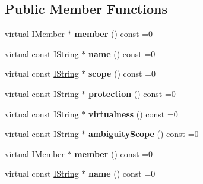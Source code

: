 \subsection*{Public Member Functions}
\begin{DoxyCompactItemize}
\item 
\mbox{\label{class_i_member_reference_ab4661b465ced109b00ef6eb16cc86cae}} 
virtual \mbox{\hyperlink{class_i_member}{I\+Member}} $\ast$ {\bfseries member} () const =0
\item 
\mbox{\label{class_i_member_reference_a9a088e72007a90f84ff891fb75b42264}} 
virtual const \mbox{\hyperlink{class_i_string}{I\+String}} $\ast$ {\bfseries name} () const =0
\item 
\mbox{\label{class_i_member_reference_a03c260b8caefa88f1795a07fe58725d0}} 
virtual const \mbox{\hyperlink{class_i_string}{I\+String}} $\ast$ {\bfseries scope} () const =0
\item 
\mbox{\label{class_i_member_reference_a72be0800929ad0d6203dec8d54c51f46}} 
virtual const \mbox{\hyperlink{class_i_string}{I\+String}} $\ast$ {\bfseries protection} () const =0
\item 
\mbox{\label{class_i_member_reference_aaca18605eb8061bb6aacc2d003508e68}} 
virtual const \mbox{\hyperlink{class_i_string}{I\+String}} $\ast$ {\bfseries virtualness} () const =0
\item 
\mbox{\label{class_i_member_reference_a22d546b2a7ec35b9e162f47b9f09000f}} 
virtual const \mbox{\hyperlink{class_i_string}{I\+String}} $\ast$ {\bfseries ambiguity\+Scope} () const =0
\item 
\mbox{\label{class_i_member_reference_ab4661b465ced109b00ef6eb16cc86cae}} 
virtual \mbox{\hyperlink{class_i_member}{I\+Member}} $\ast$ {\bfseries member} () const =0
\item 
\mbox{\label{class_i_member_reference_a9a088e72007a90f84ff891fb75b42264}} 
virtual const \mbox{\hyperlink{class_i_string}{I\+String}} $\ast$ {\bfseries name} () const =0
\item 

\end{DoxyCompactItemize}

